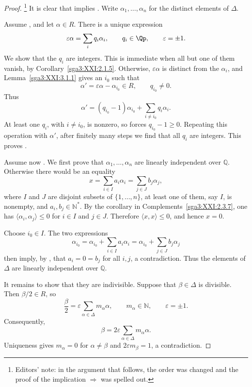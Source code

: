 \begin{proof}
\footnote{Editors' note: in the argument that follows, the order was
changed and the proof of the implication \(\Rightarrow\) was
spelled out.}
It is clear that  implies . Write
\(\alpha_1,\ldots,\alpha_n\) for the distinct elements of \(\Delta\).

Assume , and let \(\alpha\in R\). There is a unique expression
\[
 \varepsilon\alpha=\sum_i q_i\alpha_i,
 \qquad q_i\in\Qp,\qquad\varepsilon=\pm1.
\]
We show that the \(q_i\) are integers. This is immediate when all but
one of them vanish, by Corollary~\ref{sga3:XXI:2.1.5}. Otherwise,
\(\varepsilon\alpha\) is distinct from the \(\alpha_i\), and
Lemma~\ref{sga3:XXI:3.1.1} gives an \(i_0\) such that
\[
 \alpha'=\varepsilon\alpha-\alpha_{i_0}\in R,
 \qquad q_{i_0}\neq0.
\]
Thus
\[
 \alpha'
 =(q_{i_0}-1)\alpha_{i_0}
  +\sum_{i\neq i_0}q_i\alpha_i.
\]
At least one \(q_i\), with \(i\neq i_0\), is nonzero, so  forces
\(q_{i_0}-1\geq0\). Repeating this operation with \(\alpha'\), after
finitely many steps we find that all \(q_i\) are integers. This proves
.

Assume now . We first prove that
\(\alpha_1,\ldots,\alpha_n\) are linearly independent over
\(\mathbb Q\). Otherwise there would be an equality
\[
 x=\sum_{i\in I}a_i\alpha_i
  =\sum_{j\in J}b_j\alpha_j,
\]
where \(I\) and \(J\) are disjoint subsets of
\(\{1,\ldots,n\}\), at least one of them, say \(I\), is nonempty, and
\(a_i,b_j\in\mathbb N^\ast\). By the corollary in
Complements~\ref{sga3:XXI:2.3.7}, one has
\(\langle\alpha_i,\alpha_j\rangle\leq0\) for \(i\in I\) and \(j\in J\).
Therefore \(\langle x,x\rangle\leq0\), and hence \(x=0\).

Choose \(i_0\in I\). The two expressions
\[
 \alpha_{i_0}
 =\alpha_{i_0}+\sum_{i\in I}a_i\alpha_i
 =\alpha_{i_0}+\sum_{j\in J}b_j\alpha_j
\]
then imply, by , that \(a_i=0=b_j\) for all \(i,j\), a
contradiction. Thus the elements of \(\Delta\) are linearly
independent over \(\mathbb Q\).

It remains to show that they are indivisible. Suppose that
\(\beta\in\Delta\) is divisible. Then \(\beta/2\in R\), so
\[
 \frac{\beta}{2}
 =\varepsilon\sum_{\alpha\in\Delta}m_\alpha\alpha,
 \qquad m_\alpha\in\mathbb N,\qquad\varepsilon=\pm1.
\]
Consequently,
\[
 \beta=2\varepsilon\sum_{\alpha\in\Delta}m_\alpha\alpha.
\]
Uniqueness gives \(m_\alpha=0\) for \(\alpha\neq\beta\) and
\(2\varepsilon m_\beta=1\), a contradiction.
\end{proof}

